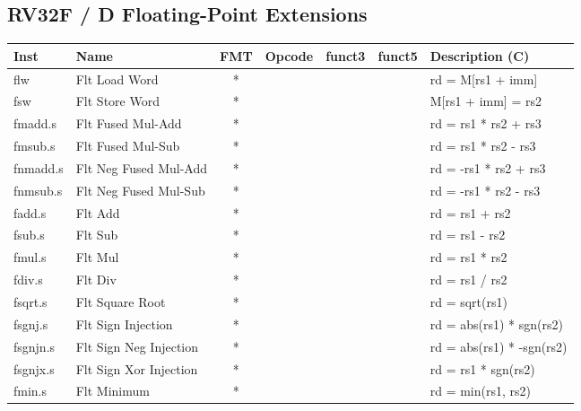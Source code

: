 \subsection*{RV32F / D Floating-Point Extensions}

\begin{center}
\begin{tabular}
{T | l | c | T | T | T | T } \hline
\rm Inst  & Name                  & FMT   & \rm Opcode & \rm funct3 & \rm funct5 & \rm Description (C)         \\ \hline
flw       & Flt Load Word         & *     &            &        &        & rd = M[rs1 + imm]    \\
fsw       & Flt Store Word        & *     &            &        &        & M[rs1 + imm] = rs2   \\
fmadd.s   & Flt Fused Mul-Add     & *     &            &        &        & rd = rs1 * rs2 + rs3 \\
fmsub.s   & Flt Fused Mul-Sub     & *     &            &        &        & rd = rs1 * rs2 - rs3 \\
fnmadd.s  & Flt Neg Fused Mul-Add & *     &            &        &        & rd = -rs1 * rs2 + rs3 \\
fnmsub.s  & Flt Neg Fused Mul-Sub & *     &            &        &        & rd = -rs1 * rs2 - rs3 \\
fadd.s    & Flt Add               & *     &            &        &        & rd = rs1 + rs2       \\
fsub.s    & Flt Sub               & *     &            &        &        & rd = rs1 - rs2       \\
fmul.s    & Flt Mul               & *     &            &        &        & rd = rs1 * rs2       \\
fdiv.s    & Flt Div               & *     &            &        &        & rd = rs1 / rs2       \\
fsqrt.s   & Flt Square Root       & *     &            &        &        & rd = sqrt(rs1)       \\
fsgnj.s   & Flt Sign Injection    & *     &            &        &        & rd = abs(rs1) * sgn(rs2) \\
fsgnjn.s  & Flt Sign Neg Injection& *     &            &        &        & rd = abs(rs1) * -sgn(rs2) \\
fsgnjx.s  & Flt Sign Xor Injection& *     &            &        &        & rd = rs1 * sgn(rs2)  \\
fmin.s    & Flt Minimum           & *     &            &        &        & rd = min(rs1, rs2)   \\

\end{tabular}
\end{center}

